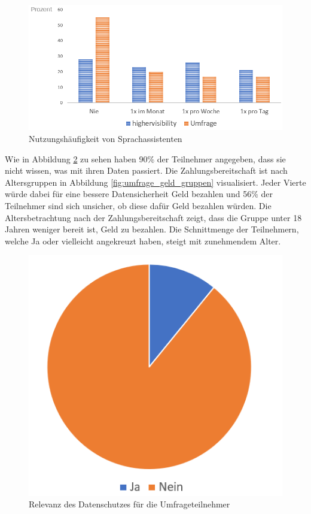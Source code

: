 \begin{figure}[h!]
	\centering
	\includegraphics[width=0.7\linewidth]{Picture/umfrage_haeufigkeit}
	\caption[Nutzungshäufigkeit von Sprachassistenten]{Nutzungshäufigkeit von Sprachassistenten}
	\label{fig:umfrage_haeufigkeit}
\end{figure} 

Wie in Abbildung \ref{fig:umfrage_datenschutz} zu sehen haben 90\% der Teilnehmer angegeben, dass sie nicht wissen, was mit ihren Daten passiert. Die Zahlungsbereitschaft ist nach Altersgruppen in Abbildung \ref{fig:umfrage_geld_gruppen} visualisiert. Jeder Vierte würde dabei für eine bessere Datensicherheit Geld bezahlen und 56\% der Teilnehmer sind sich unsicher, ob diese dafür Geld bezahlen würden. Die Altersbetrachtung nach der Zahlungsbereitschaft zeigt, dass die Gruppe unter 18 Jahren weniger bereit ist, Geld zu bezahlen. Die Schnittmenge der Teilnehmern, welche Ja oder vielleicht angekreuzt haben, steigt mit zunehmendem Alter.

\begin{figure}
	\centering
	\includegraphics[width=0.5\linewidth]{Picture/umfrage_datenschutz}
	\caption[Relevanz des Datenschutzes für die Umfrageteilnehmer]{Relevanz des Datenschutzes für die Umfrageteilnehmer}
	\label{fig:umfrage_datenschutz}
\end{figure}

